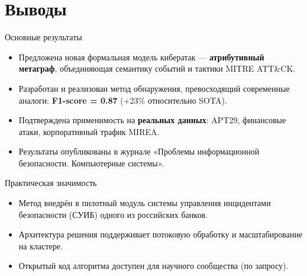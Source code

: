
\section{Выводы}

\begin{frame}{Основные результаты}
    \begin{itemize}
        \item Предложена новая формальная модель кибератак — \textbf{атрибутивный метаграф}, объединяющая семантику событий и тактики MITRE ATT\&CK.
        \item Разработан и реализован метод обнаружения, превосходящий современные аналоги: \textbf{F1-score = 0.87} (+23\% относительно SOTA).
        \item Подтверждена применимость на \textbf{реальных данных}: APT29, финансовые атаки, корпоративный трафик MIREA.
        \item Результаты опубликованы в журнале «Проблемы информационной безопасности. Компьютерные системы».
    \end{itemize}
\end{frame}

\begin{frame}{Практическая значимость}
    \begin{itemize}
        \item Метод внедрён в пилотный модуль системы управления инцидентами безопасности (СУИБ) одного из российских банков.
        \item Архитектура решения поддерживает потоковую обработку и масштабирование на кластере.
        \item Открытый код алгоритма доступен для научного сообщества (по запросу).
    \end{itemize}
\end{frame}


